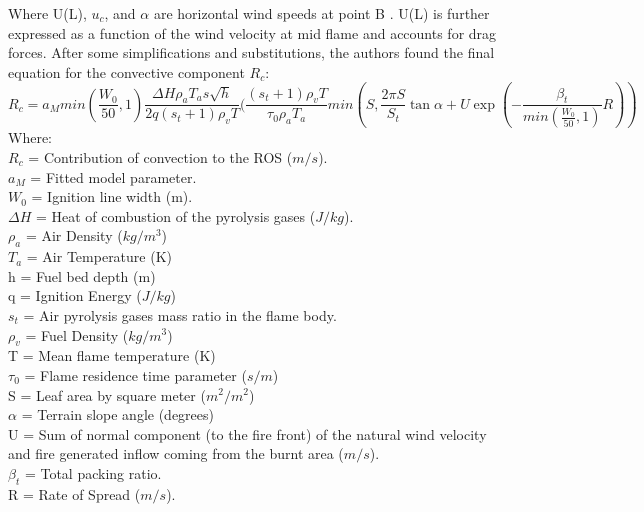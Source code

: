 \documentclass{article}
\begin{document}
Where U(L), $u_c$, and $\alpha$ are horizontal wind speeds at point B \citep{Chatelon2022}. U(L) is further expressed as a function of the wind velocity at mid flame and accounts for drag forces. After some simplifications and substitutions, the authors found the final equation for the convective component $R_c$: \\
\begin{equation}
	\label{convective component}
	R_c = a_M min(\frac {W_0}{50}, 1) \frac {\Delta H \rho _ a T_a s \sqrt{h}}{2q(s_t + 1) \rho _ v T} (\frac {(s_t + 1) \rho _ v T}{\tau _ 0 \rho _ a T_a} min(S, \frac {2 \pi S}{S_t} \tan \alpha + U \exp (- \frac {\beta _ t}{min(\frac{W_0}{50}, 1)} R))
\end{equation}
Where: \\
$R_c$ = Contribution of convection to the ROS ($m/s$).\\
$a_M$ = Fitted model parameter. \\
$W_0$ = Ignition line width (m). \\
$\Delta H$ = Heat of combustion of the pyrolysis gases ($J / kg$). \\
$\rho _ a$ = Air Density ($kg/m^3$) \\
$T_a$ = Air Temperature (K) \\
h = Fuel bed depth (m) \\
q = Ignition Energy ($J / kg$) \\
$s_t$ = Air pyrolysis gases mass ratio in the flame body. \\
$\rho _ v$ = Fuel Density ($kg/m^3$) \\
T = Mean flame temperature (K)\\
$\tau _ 0$ = Flame residence time parameter ($s / m$) \\
S = Leaf area by square meter ($m^ 2 / m^2$) \\
$\alpha$ = Terrain slope angle (degrees)\\
U = Sum of normal component (to the fire front) of the natural wind velocity and fire generated inflow coming from the burnt area ($m / s$). \\
$\beta _ t$ = Total packing ratio. \\
R = Rate of Spread ($m / s$). \\
\end{document}
